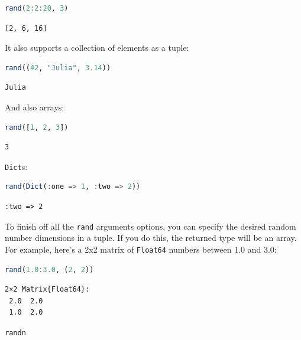 \documentclass[
  notoc %
]{tufte-book}
\makeatletter
\newcommand{\passthrough}[1]{#1}
\renewcommand\subsubsection{%
\@startsection{subsubsection}{3}{\z@ }{-3.25ex\@plus -1ex \@minus -.2ex}{1.5ex \@plus .2ex}{\normalfont \normalsize \bfseries }
}
\makeatother
\begin{document}
\begin{lstlisting}[language=Julia]
rand(2:2:20, 3)
\end{lstlisting}

\begin{lstlisting}[language=Output]
[2, 6, 16]
\end{lstlisting}

It also supports a collection of elements as a tuple:

\begin{lstlisting}[language=Julia]
rand((42, "Julia", 3.14))
\end{lstlisting}

\begin{lstlisting}[language=Output]
Julia
\end{lstlisting}

And also arrays:

\begin{lstlisting}[language=Julia]
rand([1, 2, 3])
\end{lstlisting}

\begin{lstlisting}[language=Output]
3
\end{lstlisting}

\passthrough{\lstinline!Dict!}s:

\begin{lstlisting}[language=Julia]
rand(Dict(:one => 1, :two => 2))
\end{lstlisting}

\begin{lstlisting}[language=Output]
:two => 2
\end{lstlisting}

To finish off all the \passthrough{\lstinline!rand!} arguments options,
you can specify the desired random number dimensions in a tuple. If you
do this, the returned type will be an array. For example, here's a 2x2
matrix of \passthrough{\lstinline!Float64!} numbers between 1.0 and 3.0:

\begin{lstlisting}[language=Julia]
rand(1.0:3.0, (2, 2))
\end{lstlisting}

\begin{lstlisting}[language=Output]
2×2 Matrix{Float64}:
 2.0  2.0
 1.0  2.0
\end{lstlisting}

\hypertarget{sec:random_randn}{%
\subsubsection{\texorpdfstring{\texttt{randn}}{randn}}\label{sec:random_randn}}
\end{document}
